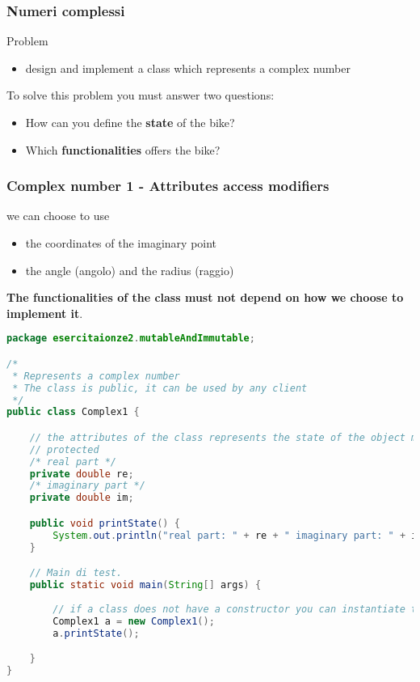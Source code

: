 \documentclass{article}
\begin{document}
\subsubsection{Numeri complessi}
Problem
\begin{itemize}
\item  design and implement a class which represents a complex number
\end{itemize}

To solve this problem you must answer two questions:
\begin{itemize}
\item How can you define the \textbf{state} of the bike?
\item Which \textbf{functionalities} offers the bike?
\end{itemize}
 
\subsubsection{Complex number 1 - Attributes access modifiers}
we can choose to use
\begin{itemize}
\item  the coordinates of the imaginary point
\item the angle (angolo) and the radius (raggio)
\end{itemize}

\textbf{The functionalities of the class must not depend on how we choose to implement it}.

\begin{lstlisting}[language=Java,escapechar=|]
package esercitaionze2.mutableAndImmutable;

/*
 * Represents a complex number
 * The class is public, it can be used by any client
 */
public class Complex1 {

	// the attributes of the class represents the state of the object modeled by the class and are usually private or 
	// protected
	/* real part */
	private double re;
	/* imaginary part */
	private double im;

	public void printState() {
		System.out.println("real part: " + re + " imaginary part: " + im);
	}

	// Main di test.
	public static void main(String[] args) {
		
		// if a class does not have a constructor you can instantiate the class using the default constructor
		Complex1 a = new Complex1();
		a.printState();

	}
}
\end{lstlisting}
\end{document}
